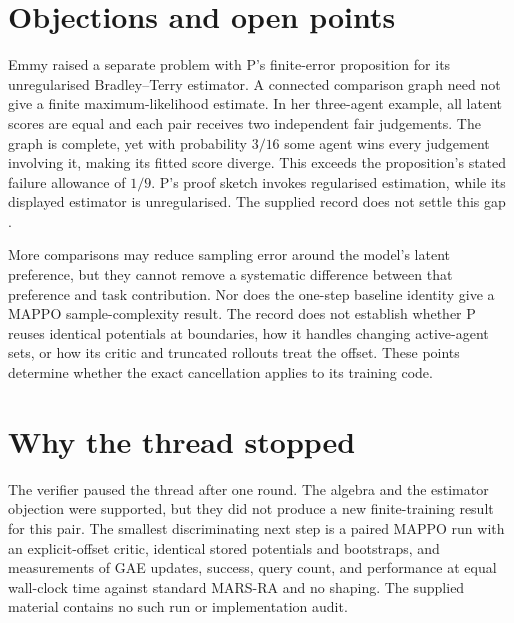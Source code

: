 \documentclass{article}
\begin{document}
\section{Objections and open points}

Emmy raised a separate problem with P's finite-error proposition for its unregularised Bradley--Terry estimator. A connected comparison graph need not give a finite maximum-likelihood estimate. In her three-agent example, all latent scores are equal and each pair receives two independent fair judgements. The graph is complete, yet with probability \(3/16\) some agent wins every judgement involving it, making its fitted score diverge. This exceeds the proposition's stated failure allowance of \(1/9\). P's proof sketch invokes regularised estimation, while its displayed estimator is unregularised. The supplied record does not settle this gap \cite{P}.

More comparisons may reduce sampling error around the model's latent preference, but they cannot remove a systematic difference between that preference and task contribution. Nor does the one-step baseline identity give a MAPPO sample-complexity result. The record does not establish whether P reuses identical potentials at boundaries, how it handles changing active-agent sets, or how its critic and truncated rollouts treat the offset. These points determine whether the exact cancellation applies to its training code.

\section{Why the thread stopped}

The verifier paused the thread after one round. The algebra and the estimator objection were supported, but they did not produce a new finite-training result for this pair. The smallest discriminating next step is a paired MAPPO run with an explicit-offset critic, identical stored potentials and bootstraps, and measurements of GAE updates, success, query count, and performance at equal wall-clock time against standard MARS-RA and no shaping. The supplied material contains no such run or implementation audit.



\end{document}
